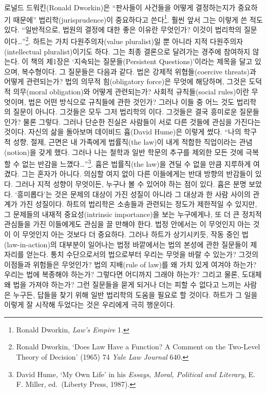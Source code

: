 로널드 드워킨(Ronald Dworkin)은 “판사들이 사건들을 어떻게 결정하는지가
중요하기 때문에” 법리학(jurisprudence)이 중요하다고 쓴다\footnote{Ronald
  Dworkin, \emph{Law's Empire} 1.}. 훨씬 앞서 그는 이렇게 쓴 적도 있다.
“일반적으로, 법원의 결정에 대한 좋은 이유란 무엇인가? 이것이 법리학의
 질문이다\ldots{}”\footnote{Ronald Dworkin, `Does Law
  Have a Function? A Comment on the Two-Level Theory of Decision' (1965)
  74 \emph{Yale Law Journal} 640.}. 하트는 가치 다원주의자(value
pluralist)일 뿐 아니라 지적 다원주의자(intellectual pluralist)이기도
하다. 그는 최종 결론으로 달려가는 경주에 참여하지 않는다. 이 책의
제1장은 ‘지속되는 질문들(Persistent Questions)’이라는 제목을 달고
있으며, 복수형이다. 그 질문들은 다음과 같다. 법은 강제적 위협들(coercive
threats)과 어떻게 관련되는가? 법의 의무적 힘(obligatory force)은 무엇에
해당하며, 그것은 도덕적 의무(moral obligation)와 어떻게 관련되는가?
사회적 규칙들(social rules)이란 무엇이며, 법은 어떤 방식으로 규칙들에
관한 것인가? 그러나 이들 중 어느 것도 법리학의  질문이
아니다. 그것들은 모두 그저 법리학의 이다.
그것들은 결국 흥미로운 질문들인가? 물론 그렇다. 그러나 단순한 진실은
사람들이 서로 다른 것들에 관심을 가진다는 것이다. 자신의 삶을 돌아보며
데이비드 흄(David Hume)은 이렇게 썼다. “나의 학구적 성향, 절제, 근면은
내 가족에게 법률직(the law)이 내게 적합한 직업이라는 관념(notion)을 갖게
했다. 그러나 나는 철학과 일반 학문의 추구를 제외한 모든 것에 극복할 수
없는 반감을 느꼈다\ldots{}”\footnote{David Hume, `My Own Life' in his
  \emph{Essays}, \emph{Moral, Political and Literary}, E. F. Miller,
  ed.~(Liberty Press, 1987).}. 흄은 법률직(the law)을 견딜 수 없을 만큼
지루하게 여겼다. 그는 혼자가 아니다. 의심할 여지 없이 다른 이들에게는
반대 방향의 반감들이 있다. 그러나 지적 성향이 무엇이든, 누구나 볼 수
있어야 하는 점이 있다. 흄은 분명 보았다. ‘흥미롭다’는 것은 문제의 대상이
가진 성질이 아니라 그 대상과 한 사람 사이의 관계가 가진 성질이다. 하트의
법리학은 소송들과 관련되는 정도가 제한적일 수 있지만, 그 문제들의 내재적
중요성(intrinsic importance)을 보는 누구에게나, 또 더 큰 정치적 관심들을
가진 이들에게도 관심을 끌 만해야 한다. 법정 안에서는 이 무엇인지 아는 것이 이 무엇인지 아는 것보다 더
중요하다. 그러나 하트가 상기시키듯, 작동 중인 법(law-in-action)의
대부분이 일어나는 법정 바깥에서는 법의 본성에 관한 질문들이 제자리를
얻는다. 통치 수단으로서의 법으로부터 우리는 무엇을 바랄 수 있는가?
그것의 이점들과 위험들은 무엇인가? 법의 지배(rule of law)를 왜 가치 있게
여겨야 하는가? 우리는 법에 복종해야 하는가? 그렇다면 어디까지 그래야
하는가? 그리고 물론, 도대체 왜 법을 가져야 하는가? 그런 질문들을 묻게
되거나 더는 피할 수 없다고 느끼는 사람은 누구든, 답들을 찾기 위해 일반
법리학의 도움을 필요로 할 것이다. 하트가 그 일을 이렇게 잘 시작해
두었다는 것은 우리에게 극히 행운이다.
